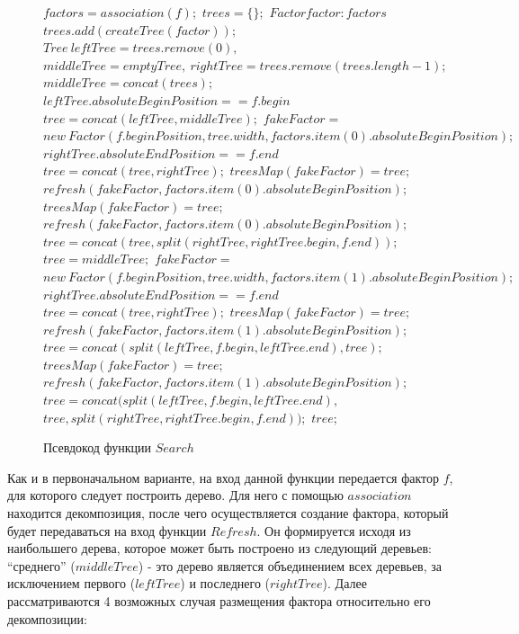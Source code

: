 \documentclass[12pt,a4paper]{extarticle}
\theoremstyle{break}
\begin{document}
\begin{figure}
	\begin{center}
	  \begin{varwidth}{\linewidth}
		\begin{codebox}
				\li	$factors = association(f);$
				\li	$trees = \{\};$
				\li	\For $Factor factor : factors$
				\li		\Do
				\li		$trees.add(createTree(factor));$
						\End
				\li	$Tree\ leftTree = trees.remove(0),$\\ $middleTree = emptyTree,\ rightTree =
				trees.remove(trees.length - 1);$ 
				\li	$middleTree = concat(trees);$
				\li \If $leftTree.absoluteBeginPosition == f.begin$
				\li		\Then 
				\li		$tree = concat(leftTree, middleTree);$
				\li		$fakeFactor =$ \\ 
					$new\ Factor(f.beginPosition, tree.width, factors.item(0).absoluteBeginPosition);$ 
				\li		\If $rightTree.absoluteEndPosition == f.end$ 
				\li			\Then
				\li			$tree = concat(tree, rightTree);$
				\li			$treesMap(fakeFactor) = tree;$
				\li			$refresh(fakeFactor, factors.item(0).absoluteBeginPosition);$
				\li			\Else
				\li			$treesMap(fakeFactor) = tree;$
				\li			$refresh(fakeFactor, factors.item(0).absoluteBeginPosition);$
				\li			$tree = concat(tree, split(rightTree, rightTree.begin, f.end));$
				\End
				\li	\Else
				\li		$tree = middleTree;$
				\li		$fakeFactor =$ \\ 
					$new\ Factor(f.beginPosition, tree.width, factors.item(1).absoluteBeginPosition);$
				\li		\If $rightTree.absoluteEndPosition == f.end$
				\li			\Then
				\li			$tree = concat(tree, rightTree);$
				\li			$treesMap(fakeFactor) = tree;$
				\li			$refresh(fakeFactor, factors.item(1).absoluteBeginPosition);$
				\li			$tree = concat(split(leftTree, f.begin, leftTree.end), tree);$
				\li			\Else
				\li			$treesMap(fakeFactor) = tree;$
				\li			$refresh(fakeFactor, factors.item(1).absoluteBeginPosition);$
				\li			$tree = concat(split(leftTree, f.begin, leftTree.end),$\\ $tree,
				split(rightTree, rightTree.begin, f.end));$
				\End	
				\End
				\li \Return $tree;$
		\end{codebox}
		\caption{Псевдокод функции $Search$}
		\label{searchnew}
	  \end{varwidth}
	\end{center}
\end{figure}

Как и в первоначальном варианте, на вход данной функции передается фактор $f$,
для которого следует построить дерево. Для него с помощью $association$
находится декомпозиция, после чего осуществляется создание фактора, который будет
передаваться на вход функции $Refresh$. Он формируется исходя из наибольшего
дерева, которое может быть построено из следующий деревьев: ``среднего''
($middleTree$) - это дерево является объединением всех деревьев, за исключением
первого ($leftTree$) и последнего ($rightTree$). Далее рассматриваются 4
возможных случая размещения фактора относительно его декомпозиции:
\end{document}
